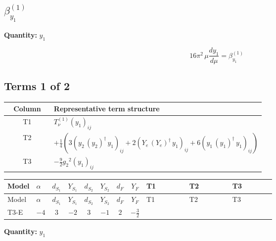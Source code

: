 \documentclass[8pt]{article}
\begin{document}
\begin{landscape}
\section*{$\beta_{y_1}^{(1)}$}
\noindent\textbf{Quantity: }$y_1$\par\smallskip
\[16\pi^2\,\mu\frac{d y_1}{d\mu}=\beta_{y_1}^{(1)}\]
\subsection*{Terms 1 of 2}
\begin{center}
\begin{tabular}{@{}c >{\raggedright\arraybackslash}p{0.82\linewidth}@{}}
\toprule
Column & Representative term structure \\
\midrule
T1 & \(\displaystyle T_{\nu}^{(1)} \left({y_1}\right)_{ij}\) \\
\midrule
T2 & \(\displaystyle +\frac{1}{4} (3 \left({y_2}\,\left({y_2}\right)^{\dagger}\,{y_1}\right)_{ij}+2 \left({Y_e}\,\left({Y_e}\right)^{\dagger}\,{y_1}\right)_{ij}+6 \left({y_1}\,\left({y_1}\right)^{\dagger}\,{y_1}\right)_{ij})\) \\
\midrule
T3 & \(\displaystyle -\frac{9}{2} {g_2}^2 \left({y_1}\right)_{ij}\) \\
\midrule
\bottomrule
\end{tabular}
\end{center}
\smallskip
\tiny
\begin{longtable}{@{}llcccccc >{\raggedright\arraybackslash}p{0.21\linewidth} >{\raggedright\arraybackslash}p{0.21\linewidth} >{\raggedright\arraybackslash}p{0.21\linewidth}@{}}
\toprule
Model & $\alpha$ & $d_{S_1}$ & $Y_{S_1}$ & $d_{S_2}$ & $Y_{S_2}$ & $d_F$ & $Y_F$ & T1 & T2 & T3 \\
\midrule
\endfirsthead
\toprule
Model & $\alpha$ & $d_{S_1}$ & $Y_{S_1}$ & $d_{S_2}$ & $Y_{S_2}$ & $d_F$ & $Y_F$ & T1 & T2 & T3 \\
\midrule
\endhead
T3-E & $-4$ & $3$ & $-2$ & $3$ & $-1$ & $2$ & $-\frac{3}{2}$ & \scriptsize\adjustbox{max width=\linewidth}{$\begin{gathered} T_{\nu}^{(1)} \left({y_1}\right)_{ij}\end{gathered}$} & \scriptsize\adjustbox{max width=\linewidth}{$\begin{gathered} +\frac{1}{4} (3 \left({y_2}\,\left({y_2}\right)^{\dagger}\,{y_1}\right)_{ij}+2 \left({Y_e}\,\left({Y_e}\right)^{\dagger}\,{y_1}\right)_{ij}+6 \left({y_1}\,\left({y_1}\right)^{\dagger}\,{y_1}\right)_{ij})\end{gathered}$} & \scriptsize\adjustbox{max width=\linewidth}{$\begin{gathered} -\frac{9}{2} {g_2}^2 \left({y_1}\right)_{ij}\end{gathered}$} \\
\midrule
\bottomrule
\end{longtable}
\clearpage
\noindent\textbf{Quantity: }$y_1$\par\smallskip

\end{landscape}
\end{document}
